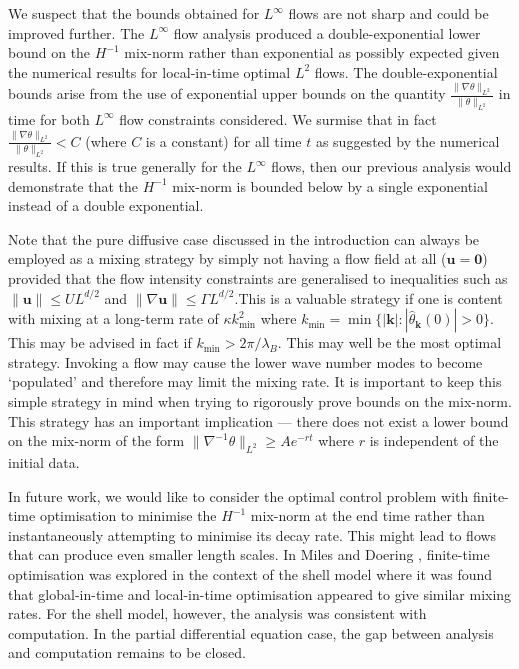 \documentclass[12pt]{iopart}
\newcommand{\hmone}[1]{\|\nabla^{-1} #1\|_{L^{2}}}
\newcommand{\ltwo}[1]{\|#1\|_{L^{2}}}
\newcommand{\hone}[1]{\| \nabla #1\|_{L^{2}}}
\renewcommand{\vec}[1]{\mathbf{#1}}
\begin{document}
We suspect that the bounds obtained for $L^{\infty}$ flows are not sharp and could be improved further. The $L^{\infty}$ flow analysis produced a double-exponential lower bound on the $H^{-1}$ mix-norm rather than exponential as possibly expected given the numerical results for local-in-time optimal $L^2$ flows. The double-exponential bounds arise from the use of exponential upper bounds on the quantity $\frac{\hone{\theta}}{\ltwo{\theta}}$ in time for both $L^{\infty}$ flow constraints considered. We surmise that in fact $\frac{\hone{\theta}}{\ltwo{\theta}} < C$ (where $C$ is a constant) for all time $t$ as suggested by the numerical results. If this is true generally for the $L^{\infty}$  flows, then our previous analysis would demonstrate that the $H^{-1}$ mix-norm is bounded below by a single exponential instead of a double exponential.

Note that the pure diffusive case discussed in the introduction can always be employed as a mixing strategy by simply not having a flow field at all ($\vec{u} =\vec{0}$) provided that the flow intensity constraints are generalised to inequalities such as $\|\vec{u}\| \leq UL^{d/2}$ and $\|\nabla \vec{u}\| \leq \Gamma L^{d/2}$.This is a valuable strategy if one is content with mixing at a long-term rate of $\kappa k_{\min}^2$ where $k_{\min} = \min \{ |\vec{k}|  :  |\hat{\theta}_{\vec{k}}(0)| > 0  \}$. This may be advised in fact if $k_{\min} > 2 \pi / \lambda_{B}$. This may well be the most optimal strategy. Invoking a flow may cause the lower wave number modes to become `populated' and therefore may limit the mixing rate. It is important to keep this simple strategy in mind when trying to rigorously prove bounds on the mix-norm. This strategy has an important implication --- there does not exist a lower bound on the mix-norm of the form $\hmone{\theta} \geq A e^{-rt}$ where  $r$ is independent of the initial data.

In future work, we would like to consider the optimal control problem with finite-time optimisation to minimise the $H^{-1}$ mix-norm at the end time rather than instantaneously attempting to minimise its decay rate. This might lead to flows that can produce even smaller length scales. In Miles and Doering \cite{Miles2017a}, finite-time optimisation was explored in the context of the shell model where it was found that global-in-time and local-in-time optimisation appeared to give similar mixing rates. For the shell model, however, the analysis was consistent with computation. In the partial differential equation case, the gap between analysis and computation remains to be closed.
\end{document}
